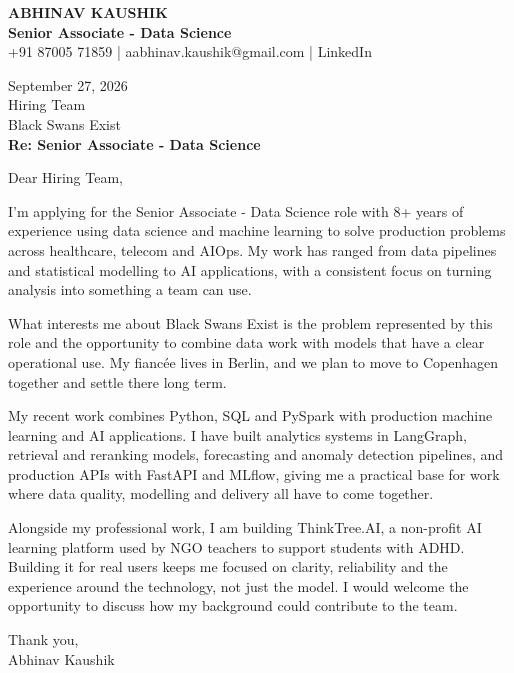 \documentclass[10pt,a4paper]{article}
\begin{document}
\begin{center}
{\Large\bfseries ABHINAV KAUSHIK}\\[2pt]
{\bfseries Senior Associate - Data Science}\\[2pt]
+91 87005 71859 \quad | \quad aabhinav.kaushik@gmail.com \quad | \quad LinkedIn
\end{center}
\vspace{8pt}
September 27, 2026\\[6pt]
Hiring Team\\
Black Swans Exist\\[4pt]
\textbf{Re: Senior Associate - Data Science}

Dear Hiring Team,

I’m applying for the Senior Associate - Data Science role with 8+ years of experience using data science and machine learning to solve production problems across healthcare, telecom and AIOps. My work has ranged from data pipelines and statistical modelling to AI applications, with a consistent focus on turning analysis into something a team can use.

What interests me about Black Swans Exist is the problem represented by this role and the opportunity to combine data work with models that have a clear operational use. My fiancée lives in Berlin, and we plan to move to Copenhagen together and settle there long term.

My recent work combines Python, SQL and PySpark with production machine learning and AI applications. I have built analytics systems in LangGraph, retrieval and reranking models, forecasting and anomaly detection pipelines, and production APIs with FastAPI and MLflow, giving me a practical base for work where data quality, modelling and delivery all have to come together.

Alongside my professional work, I am building ThinkTree.AI, a non-profit AI learning platform used by NGO teachers to support students with ADHD. Building it for real users keeps me focused on clarity, reliability and the experience around the technology, not just the model. I would welcome the opportunity to discuss how my background could contribute to the team.

Thank you,\\
Abhinav Kaushik
\end{document}
